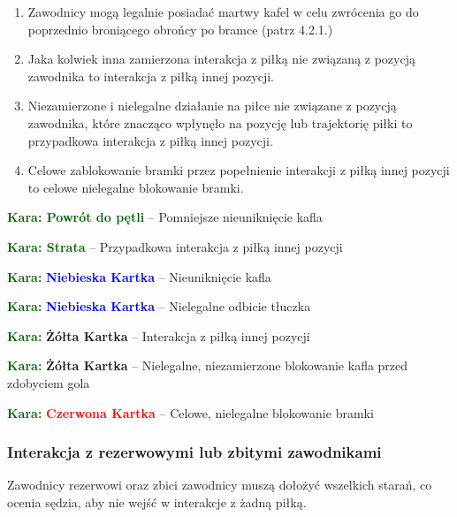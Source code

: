 \documentclass[11pt,a4paper]{article}
\newcommand\redcard[1]{\bgroup\textcolor{darkgreen}{\textbf{Kara: }}\bgroup\textcolor{red}{\textbf{Czerwona Kartka}} -- #1}
\newcommand\yellowcard[1]{\bgroup\textcolor{darkgreen}{\textbf{Kara: }}\bgroup\textcolor{darkyellow}{\textbf{Żółta Kartka}} -- #1}
\newcommand\bluecard[1]{\bgroup\textcolor{darkgreen}{\textbf{Kara: }}\bgroup\textcolor{blue}{\textbf{Niebieska Kartka}} -- #1}
\newcommand\penaltyd[2]{\bgroup\textcolor{darkgreen}{\textbf{Kara: #1}} -- #2}
\begin{document}
\begin{enumerate}
\begin{enumerate}
    \begin{enumerate}
      \item Ta zasada nie zabrania zawodnikom grającym kaflem, aby użyć go do odbicia żywego tłuczka.
      \item Jeśli zawodnik wielokrotnie nielegalnie odbija tłuczki to nie można użyć zasady ,,nie ma szkody, nie ma faulu''.
      \item Zamiast kary za interakcję z piłką innej pozycji, dawana jest kara za nielegalne odbicie tłuczka.
    \end{enumerate}
  \item Jeśli sędzia stwierdzi, że zawodnik nie był wystarczająco świadomy, że tłuczek był martwy lub ożywiony przez zawodnika tej samej drużyny i zagranie po za tym było poprawne, to nie ma kary.
  \end{enumerate}
  \item Zawodnicy mogą legalnie posiadać martwy kafel w celu zwrócenia go do poprzednio broniącego obrońcy po bramce (patrz 4.2.1.) %
  \item Jaka kolwiek inna zamierzona interakcja z piłką nie związaną z pozycją zawodnika to interakcja z piłką innej pozycji.
  \item Niezamierzone i nielegalne działanie na piłce nie związane z pozycją zawodnika, które znacząco wpłynęło na pozycję lub trajektorię piłki to przypadkowa interakcja z piłką innej pozycji.
  \item Celowe zablokowanie bramki przez popełnienie interakcji z piłką innej pozycji to celowe nielegalne blokowanie bramki.
\end{enumerate}

\penaltyd{Powrót do pętli}{Pomniejsze nieuniknięcie kafla}

\penaltyd{Strata}{Przypadkowa interakcja z piłką innej pozycji}

\bluecard{Nieuniknięcie kafla}

\bluecard{Nielegalne odbicie tłuczka}

\yellowcard{Interakcja z piłką innej pozycji}

\yellowcard{Nielegalne, niezamierzone blokowanie kafla przed zdobyciem gola}

\redcard{Celowe, nielegalne blokowanie bramki}

\subsubsection{Interakcja z rezerwowymi lub zbitymi zawodnikami}
Zawodnicy rezerwowi oraz zbici zawodnicy muszą dołożyć wszelkich starań, co ocenia sędzia, aby nie wejść w interakcje z żadną piłką.
\end{document}
